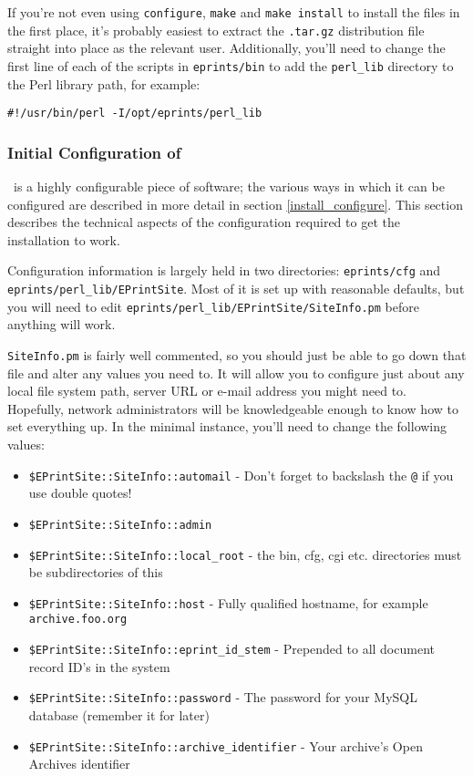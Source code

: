 If you're not even using {\tt configure}, {\tt make} and {\tt make install} to install the files in the first place, it's probably easiest to extract the {\tt .tar.gz} distribution file straight into place as the relevant user. Additionally, you'll need to change the first line of each of the scripts in {\tt eprints/bin} to add the {\tt perl\_lib} directory to the Perl library path, for example:

\begin{verbatim}
#!/usr/bin/perl -I/opt/eprints/perl_lib
\end{verbatim}


\subsubsection{Initial Configuration of \eprints}

\eprints\ is a highly configurable piece of software; the various ways in which it can be configured are described in more detail in section \ref{install_configure}. This section describes the technical aspects of the configuration required to get the installation to work.

Configuration information is largely held in two directories: {\tt eprints/cfg} and {\tt eprints/perl\_lib/EPrintSite}. Most of it is set up with reasonable defaults, but you will need to edit {\tt eprints/perl\_lib/EPrintSite/SiteInfo.pm} before anything will work.

{\tt SiteInfo.pm} is fairly well commented, so you should just be able to go down that file and alter any values you need to. It will allow you to configure just about any local file system path, server URL or e-mail address you might need to. Hopefully, network administrators will be knowledgeable enough to know how to set everything up. In the minimal instance, you'll need to change the following values:

\begin{itemize}
\item {\tt \$EPrintSite::SiteInfo::automail} - Don't forget to backslash the {\tt @} if you use double quotes!
\item {\tt \$EPrintSite::SiteInfo::admin}
\item {\tt \$EPrintSite::SiteInfo::local\_root} - the bin, cfg, cgi etc. directories must be subdirectories of this
\item {\tt \$EPrintSite::SiteInfo::host} - Fully qualified hostname, for example {\tt archive.foo.org}
\item {\tt \$EPrintSite::SiteInfo::eprint\_id\_stem} - Prepended to all document record ID's in the system
\item {\tt \$EPrintSite::SiteInfo::password} - The password for your MySQL database (remember it for later)
\item {\tt \$EPrintSite::SiteInfo::archive\_identifier} - Your archive's Open Archives identifier
\end{itemize}


